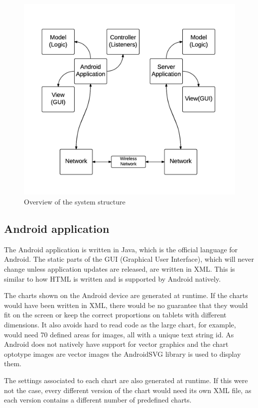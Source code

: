 \documentclass[12pt,a4paper,notitlepage]{report}
\begin{document}
\begin{figure}[h]
\centering
\includegraphics[width=120mm]{images/system_structure.png}
\caption{Overview of the system structure\label{system_structure}}
\end{figure}

\subsection{Android application}
The Android application is written in Java, which is the official language for Android. The static parts of the GUI (Graphical User Interface), which will never change unless application updates are released, are written in XML. This is similar to how HTML is written and is supported by Android natively.

The charts shown on the Android device are generated at runtime. If the charts would have been written in XML, there would be no guarantee that they would fit on the screen or keep the correct proportions on tablets with different dimensions. It also avoids hard to read code as the large chart, for example, would need 70 defined areas for images, all with a unique text string id. As Android does not natively have support for vector graphics and the chart optotype images are vector images the AndroidSVG library is used to display them. \cite{AndroidSVG}

The settings associated to each chart are also generated at runtime. If this were not the case, every different version of the chart would need its own XML file, as each version contains a different number of predefined charts.
\end{document}
